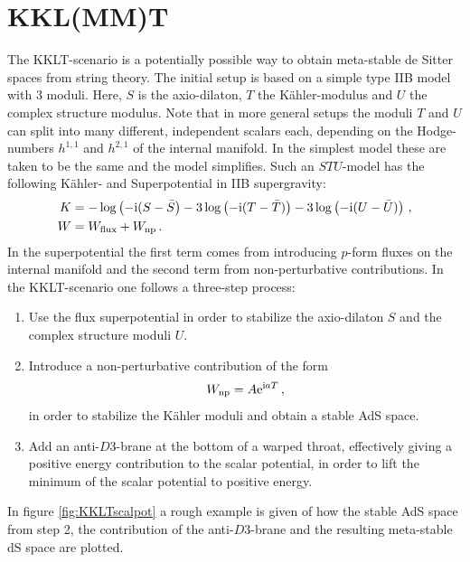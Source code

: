 \documentclass[a4paper,12pt,twoside,openright]{report}
\newcommand{\bea}{\begin{equation}\begin{aligned}}
\newcommand{\eea}{\end{aligned}\end{equation}}
\def\rmi{{\rm i}}
\def\rme{{\rm e}}
\begin{document}
\section{KKL(MM)T}
\label{sec:kklt}%
The KKLT-scenario \cite{Kachru:2003aw,Kachru:2003sx} is a potentially possible way to obtain meta-stable de Sitter spaces from string theory. The initial setup is based on a simple type IIB model with 3 moduli. Here, $S$ is the axio-dilaton, $T$ the Kähler-modulus and $U$ the complex structure modulus. Note that in more general setups the moduli $T$ and $U$ can split into many different, independent scalars each, depending on the Hodge-numbers $h^ {1,1}$ and $h^ {2,1}$ of the internal manifold. In the simplest model these are taken to be the same and the model simplifies. Such an $STU$-model has the following Kähler- and Superpotential in IIB supergravity:
\bea
K &= - \log \left( -\rmi (S- \bar{S}\right) - 3 \log\left(-\rmi (T- \bar{T}) \right) - 3 \log\left(-\rmi (U- \bar{U}) \right)\,, \\
W &= W_{\text{flux}} + W_{\text{np}}\,.
\label{eq:KWkklt}
\eea
In the superpotential the first term comes from introducing $p$-form fluxes on the internal manifold and the second term from non-perturbative contributions. In the KKLT-scenario one follows a three-step process:
\begin{enumerate}
\item Use the flux superpotential in order to stabilize the axio-dilaton $S$ and the complex structure moduli $U$.
\item Introduce a non-perturbative contribution of the form
\begin{equation}
W_{\text{np}} = A \rme^{\rmi a T}\,,
\end{equation}
in order to stabilize the Kähler moduli and obtain a stable AdS space.
\item Add an anti-$D3$-brane at the bottom of a warped throat, effectively giving a positive energy contribution to the scalar potential, in order to lift the minimum of the scalar potential to positive energy.
\end{enumerate}
In figure \ref{fig:KKLTscalpot} a rough example is given of how the stable AdS space from step 2, the contribution of the anti-$D3$-brane and the resulting meta-stable dS space are plotted.
\end{document}

